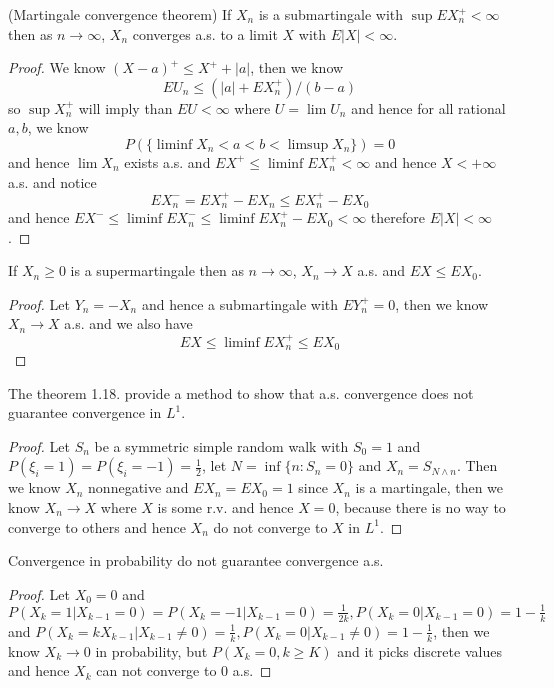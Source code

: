 \documentclass[lang=en, color=blue, ]{elegantbook}
\begin{document}
\begin{theorem}
    (Martingale convergence theorem) If $X_n$ is a submartingale with $\sup EX_n^+ < \infty$ then as $n\to\infty$, $X_n$ converges a.s. to a limit $X$ with $E|X|<\infty$.
\end{theorem}
\begin{proof}\par
    We know $(X-a)^+ \leq X^+ +|a|$, then we know
    \[EU_n \leq (|a|+EX_n^+)/(b-a)\]
    so $\sup X_n^+$ will imply than $EU < \infty$ where $U = \lim U_n$ and hence for all rational $a,b$, we know
    \[P(\{\liminf X_n < a < b < \limsup X_n\}) = 0\]
    and hence $\lim X_n$ exists a.s. and $EX^+ \leq \liminf EX_n^+ <\infty$ and hence $X<+\infty$ a.s. and notice
    \[EX_n^- = EX_n^+ - EX_n \leq EX_n^+ - EX_0\]
    and hence $EX^- \leq \liminf EX_n^- \leq \liminf EX_n^+ - EX_0 < \infty$
    therefore $E|X|<\infty$. 
\end{proof}

\begin{theorem}
    If $X_n\geq 0$ is a supermartingale then as $n\to\infty$, $X_n\to X$ a.s. and $EX\leq EX_0$.
\end{theorem}
\begin{proof}\par
    Let $Y_n = -X_n$ and hence a submartingale with $EY_n^+ = 0$, then we know $X_n \to X$ a.s. and we also have
    \[EX \leq \liminf EX_n^+ \leq EX_0\] 
\end{proof}

\begin{proposition}
    The theorem 1.18. provide a method to show that a.s. convergence does not guarantee convergence in $L^1$.
\end{proposition}
\begin{proof}\par
Let $S_n$ be a symmetric simple random walk with $S_0 = 1$ and $P(\xi_i=1) = P(\xi_i = -1) = \tfrac{1}{2}$, let $N = \inf\{n: S_n = 0\}$ and $X_n = S_{N\wedge n}$. Then we know $X_n$ nonnegative and $EX_n = EX_0=1$ since $X_n$ is a martingale, then we know $X_n \to X$ where $X$ is some r.v. and hence $X = 0$, because there is no way to converge to others and hence $X_n$ do not converge to $X$ in $L^1$.
\end{proof}

\begin{proposition}
    Convergence in probability do not guarantee convergence a.s.
\end{proposition}
\begin{proof}\par
    Let $X_0 = 0$ and $P(X_k = 1|X_{k-1} = 0) = P(X_k = -1|X_{k-1} = 0) = \tfrac{1}{2k}, P(X_k = 0|X_{k-1} = 0) = 1-\tfrac{1}{k}$ and $P(X_k = kX_{k-1}|X_{k-1} \neq 0) = \tfrac{1}{k}, P(X_k = 0|X_{k-1} \neq 0) = 1-\tfrac{1}{k}$, then we know $X_k \to 0$ in probability, but $P(X_k = 0, k\geq K)$ and it picks discrete values and hence $X_k$ can not converge to $0$ a.s. 
\end{proof}
\end{document}
